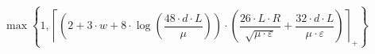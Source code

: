 \[\max\left\{ 1, \left\lceil \left(2 + 3 \cdot w + 8 \cdot \log\left(\frac{48 \cdot d \cdot L}{\mu}\right)\right) \cdot \left(\frac{26 \cdot L \cdot R}{\sqrt{\mu \cdot \varepsilon}} + \frac{32 \cdot d \cdot L}{\mu \cdot \varepsilon}\right) \right\rceil_{+} \right\}\]
